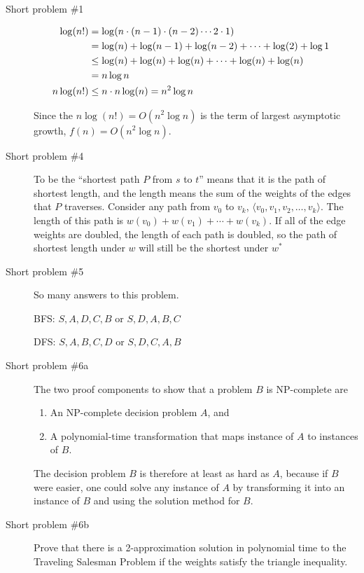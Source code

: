 \begin{description}
	\item [Short problem \#1] 
	
	\begin{align*}
		\log(n!) &= \log(n \cdot (n-1) \cdot (n-2) \cdots 2 \cdot 1) \cr
			&= \log(n) + \log(n-1) + \log(n-2) + \cdots + \log(2) + \log 1 \cr
			&\le \log(n) + \log(n) + \log(n) + \cdots + \log(n) + \log (n) \cr
			&= n \log n \cr
		n \log(n!) &\le n \cdot n\log(n) = n^2 \log n \cr
	\end{align*}
	
	Since the $n\log(n!) = O(n^2 \log n)$ is the term of largest asymptotic growth, $f(n) = O(n^2\log n)$.  

	\item [Short problem \#4]  To be the ``shortest path $P$ from $s$ to $t$'' means that it is the path of shortest length, and the length means the sum of the weights of the edges that $P$ traverses.  Consider any path from $v_0$ to $v_k$, $\langle v_0, v_1, v_2,\dots,v_k\rangle$.  The length of this path is $w(v_0) + w(v_1) + \cdots + w(v_k)$.  If all of the edge weights are doubled, the length of each path is doubled, so the path of shortest length under $w$ will still be the shortest under $w^*$
	
	\item [Short problem \#5]  So many answers to this problem.  
	
	BFS:  $S, A, D, C, B$ or $S, D, A, B, C$
	
	DFS:  $S, A, B, C, D$ or $S, D, C, A, B$
	
	\item [Short problem \#6a]
	
	The two proof components to show that a problem $B$ is NP-complete are 
	\begin{enumerate}
		\item An NP-complete decision problem $A$, and 
		\item A polynomial-time transformation that maps instance of $A$ to instances of $B$.  
	\end{enumerate}
	
	The decision problem $B$ is therefore at least as hard as $A$, because if $B$ were easier, one could solve any instance of $A$ by transforming it into an instance of $B$ and using the solution method for $B$.  
	
	\item [Short problem \#6b]  Prove that there is a 2-approximation solution in polynomial time to the Traveling Salesman Problem if the weights satisfy the triangle inequality. 
	 

\end{description}
